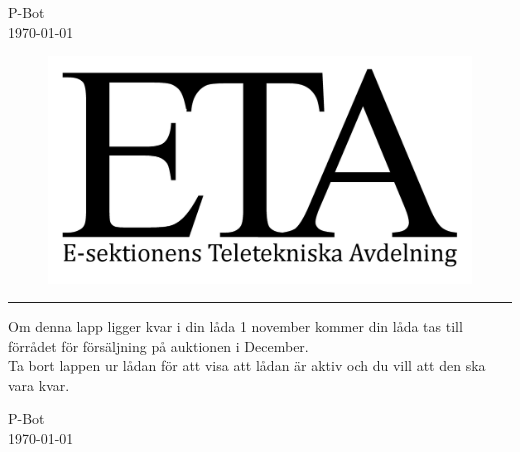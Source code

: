 \documentclass[a4paper, 60pt]{article}
\begin{document}
    \flushright
P-Bot\\
\today

\flushleft
        \begin{center}
            \begin{figure}[h]
                \includegraphics[scale = 2]{ETA-logga.png}
            \end{figure}
            \vspace{25pt}
            \newline
            \noindent\rule{\textwidth}{1pt}
                       \newline      %
            \Large Om denna lapp ligger kvar i din låda 1 november kommer din låda tas till förrådet för försäljning på auktionen i December. \\ Ta bort lappen ur lådan för att visa att lådan är aktiv och du vill att den ska vara kvar.
            
        \end{center}
    \vspace{25pt}
    \vspace{25pt}
    \flushright
    P-Bot\\
    \today
    \flushleft
\end{document}
